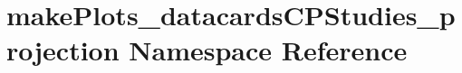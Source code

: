 \hypertarget{namespacemakePlots__datacardsCPStudies__projection}{
\section{makePlots\_\-datacardsCPStudies\_\-projection Namespace Reference}
\label{namespacemakePlots__datacardsCPStudies__projection}
}
